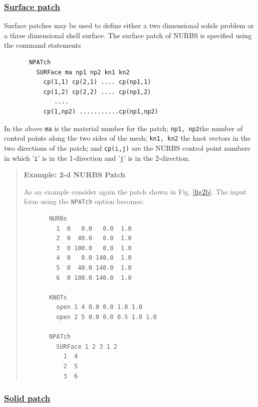 \subsubsection{\ul{Surface patch}}
           
Surface patches may be used to define either a two dimensional solids problem
or a three dimensional shell surface.
The surface patch of NURBS is specified using the command statements
\begin{verbatim}
       NPATch
         SURFace ma np1 np2 kn1 kn2
           cp(1,1) cp(2,1) .... cp(np1,1)
           cp(1,2) cp(2,2) .... cp(np1,2)
              ....
           cp(1,np2) ...........cp(np1,np2)
\end{verbatim}
In the above \texttt{ma} is the material number for the patch; \texttt{np1, np2}the number of control points along the two sides of the mesh;
\texttt{kn1, kn2} the knot
vectors in the two directions of the patch; and \texttt{cp(i,j)} are the 
NURBS control point numbers in which '\texttt{i}' is in the 1-direction
and '\texttt{j}' is in the 2-direction.

\begin{quote}
\noindent
\textbf{Example: 2-d NURBS Patch}

As an example consider again the patch shown in Fig. \ref{fig2b}. The input
form using the \texttt{NPATch} option becomes:
\begin{verbatim}
       NURBs
         1  0   0.0   0.0  1.0
         2  0  40.0   0.0  1.0
         3  0 100.0   0.0  1.0
         4  0   0.0 140.0  1.0
         5  0  40.0 140.0  1.0
         6  0 100.0 140.0  1.0

       KNOTs
         open 1 4 0.0 0.0 1.0 1.0
         open 2 5 0.0 0.0 0.5 1.0 1.0

       NPATch
         SURFace 1 2 3 1 2
           1  4
           2  5
           3  6
\end{verbatim}
\end{quote}

\subsubsection{\ul{Solid patch}}

